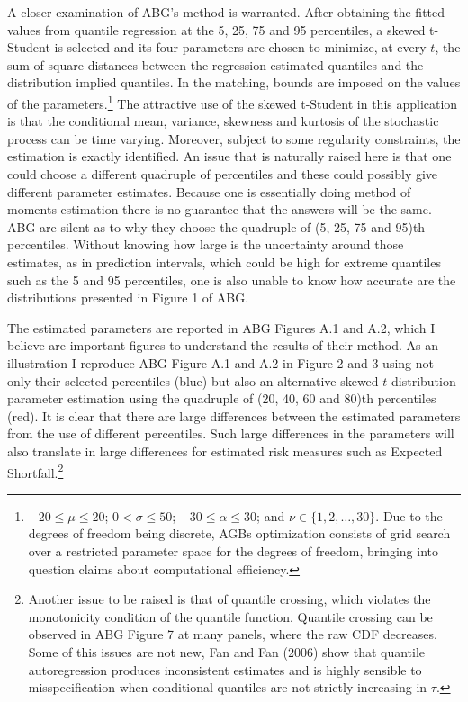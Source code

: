\documentclass[12pt,]{article}
\let\rmarkdownfootnote\footnote%
\def\footnote{\protect\rmarkdownfootnote}
\begin{document}
A closer examination of ABG's method is warranted. After obtaining the
fitted values from quantile regression at the 5, 25, 75 and 95
percentiles, a skewed t-Student is selected and its four parameters are
chosen to minimize, at every \(t\), the sum of square distances between
the regression estimated quantiles and the distribution implied
quantiles. In the matching, bounds are imposed on the values of the
parameters.\footnote{$-20 \leq \mu \leq 20$; $0 < \sigma \leq 50$; $-30 \leq \alpha \leq 30$; and $\nu \in \{1,2, \dots,30\}$. Due to the degrees of freedom being discrete, AGBs optimization consists of grid search over a restricted parameter space for the degrees of freedom, bringing into question claims about computational efficiency.}
The attractive use of the skewed t-Student in this application is that
the conditional mean, variance, skewness and kurtosis of the stochastic
process can be time varying. Moreover, subject to some regularity
constraints, the estimation is exactly identified. An issue that is
naturally raised here is that one could choose a different quadruple of
percentiles and these could possibly give different parameter estimates.
Because one is essentially doing method of moments estimation there is
no guarantee that the answers will be the same. ABG are silent as to why
they choose the quadruple of (5, 25, 75 and 95)th percentiles. Without
knowing how large is the uncertainty around those estimates, as in
prediction intervals, which could be high for extreme quantiles such as
the 5 and 95 percentiles, one is also unable to know how accurate are
the distributions presented in Figure 1 of ABG.

The estimated parameters are reported in ABG Figures A.1 and A.2, which
I believe are important figures to understand the results of their
method. As an illustration I reproduce ABG Figure A.1 and A.2 in Figure
2 and 3 using not only their selected percentiles (blue) but also an
alternative skewed \(t\)-distribution parameter estimation using the
quadruple of (20, 40, 60 and 80)th percentiles (red). It is clear that
there are large differences between the estimated parameters from the
use of different percentiles. Such large differences in the parameters
will also translate in large differences for estimated risk measures
such as Expected
Shortfall.\footnote{Another issue to be raised is that of quantile crossing, which violates the monotonicity condition of the quantile function. Quantile crossing can be observed in ABG Figure 7 at many panels, where the raw CDF decreases. Some of this issues are not new, Fan and Fan (2006) show that quantile autoregression produces inconsistent estimates and is highly sensible to misspecification when conditional quantiles are not strictly increasing in $\tau$.}
\end{document}
